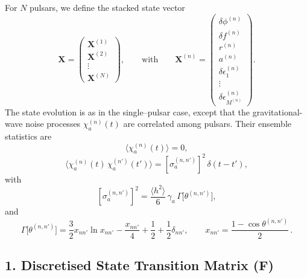 \documentclass[]{scrartcl}
\begin{document}
	For $N$ pulsars, we define the stacked state vector
	\begin{equation}
		\boldsymbol{X} = \begin{pmatrix}
			\boldsymbol{X}^{(1)} \\
			\boldsymbol{X}^{(2)} \\
			\vdots \\
			\boldsymbol{X}^{(N)}
		\end{pmatrix}, \qquad \text{with} \qquad
		\boldsymbol{X}^{(n)} = \begin{pmatrix}
			\delta \phi^{(n)}\\[1mm]
			\delta f^{(n)}\\[1mm]
			r^{(n)}\\[1mm]
			a^{(n)}\\[1mm]
			\delta\epsilon_1^{(n)}\\[1mm]
			\vdots\\[1mm]
			\delta\epsilon_{M^{(n)}}^{(n)}
		\end{pmatrix}.
	\end{equation}
	The state evolution is as in the single--pulsar case, except that the gravitational-wave noise processes $\chi_a^{(n)}(t)$ are correlated among pulsars. Their ensemble statistics are
	\begin{equation}
		\langle \chi_a^{(n)}(t) \rangle = 0,
	\end{equation}
	\begin{equation}
		\langle \chi_a^{(n)}(t)\,\chi_a^{(n')}(t') \rangle = \left[\sigma_a^{(n,n')}\right]^2\,\delta(t-t'),
	\end{equation}
	with
	\begin{equation}
		\left[\sigma_a^{(n,n')}\right]^2 = \frac{\langle h^2 \rangle}{6}\,\gamma_a\,\Gamma\bigl[\theta^{(n,n')}\bigr],
	\end{equation}
	and
	\begin{equation}
		\Gamma\bigl[\theta^{(n,n')}\bigr] = \frac{3}{2}x_{nn'}\ln x_{nn'} - \frac{x_{nn'}}{4} + \frac{1}{2} + \frac{1}{2}\delta_{nn'}, \qquad x_{nn'}=\frac{1-\cos\theta^{(n,n')}}{2}\,.
	\end{equation}
	
	\subsection*{1. Discretised State Transition Matrix (\(\boldsymbol{F}\))}
	
\end{document}

